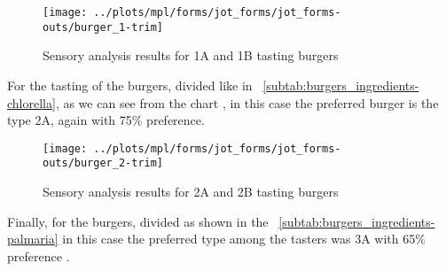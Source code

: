 \begin{figure}[H]
\scriptsize
\centering
	\begin{minipage}[b]{0.475\textwidth}%
	\centering%
	\end{minipage}%
\hspace*{0.05\textwidth}%
	\begin{minipage}[b]{0.4162\textwidth}%
	\centering%
		\texttt{[image: ../plots/mpl/forms/jot\_forms/jot\_forms-outs/burger\_1-trim]}%
	\caption{Sensory analysis results for  1A and 1B tasting burgers\label{subfig:sens_analysis-spirulina}}%
	\end{minipage}%
\end{figure}


For the tasting of the  burgers, divided like in \tab{}~\ref{subtab:burgers_ingredients-chlorella}, as we can see from the chart , in this case the preferred burger is the type 2A, again with \num{75}\% preference.

\begin{figure}[H]
\scriptsize
\centering
	\begin{minipage}[b]{0.475\textwidth}%
	\centering%
	\end{minipage}%
\hspace*{0.05\textwidth}%
	\begin{minipage}[b]{0.4162\textwidth}%
	\centering%
		\texttt{[image: ../plots/mpl/forms/jot\_forms/jot\_forms-outs/burger\_2-trim]}%
	\caption{Sensory analysis results for  2A and 2B tasting burgers\label{subfig:sens_analysis-chlorella}}%
	\end{minipage}%
\end{figure}


Finally, for the  burgers, divided as shown in the \tab{}~\ref{subtab:burgers_ingredients-palmaria} in this case the preferred type among the tasters was 3A with \num{65}\% preference .

